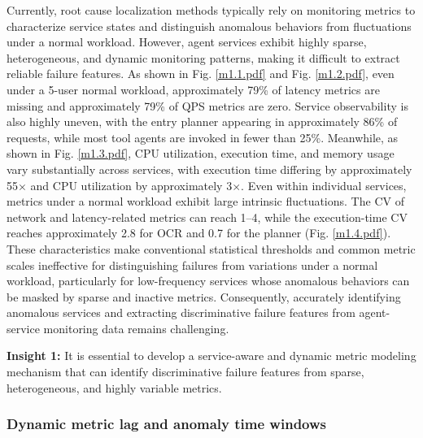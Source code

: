 Currently, root cause localization methods typically rely on monitoring metrics to characterize service states and distinguish anomalous behaviors from fluctuations under a normal workload. However, agent services exhibit highly sparse, heterogeneous, and dynamic monitoring patterns, making it difficult to extract reliable failure features. As shown in Fig. \ref{m1.1.pdf} and Fig. \ref{m1.2.pdf}, even under a 5-user normal workload, approximately 79\% of latency metrics are missing and approximately 79\% of QPS metrics are zero. Service observability is also highly uneven, with the entry planner appearing in approximately 86\% of requests, while most tool agents are invoked in fewer than 25\%. Meanwhile, as shown in Fig. \ref{m1.3.pdf}, CPU utilization, execution time, and memory usage vary substantially across services, with execution time differing by approximately 55$\times$ and CPU utilization by approximately 3$\times$. Even within individual services, metrics under a normal workload exhibit large intrinsic fluctuations. The CV of network and latency-related metrics can reach 1--4, while the execution-time CV reaches approximately 2.8 for OCR and 0.7 for the planner (Fig. \ref{m1.4.pdf}). These characteristics make conventional statistical thresholds and common metric scales ineffective for distinguishing failures from variations under a normal workload, particularly for low-frequency services whose anomalous behaviors can be masked by sparse and inactive metrics. Consequently, accurately identifying anomalous services and extracting discriminative failure features from agent-service monitoring data remains challenging.


\begin{mybox}
\textbf{Insight 1:} It is essential to develop a service-aware and dynamic metric modeling mechanism that can identify discriminative failure features from sparse, heterogeneous, and highly variable metrics.
\end{mybox}




\subsubsection{Dynamic metric lag and anomaly time windows}

